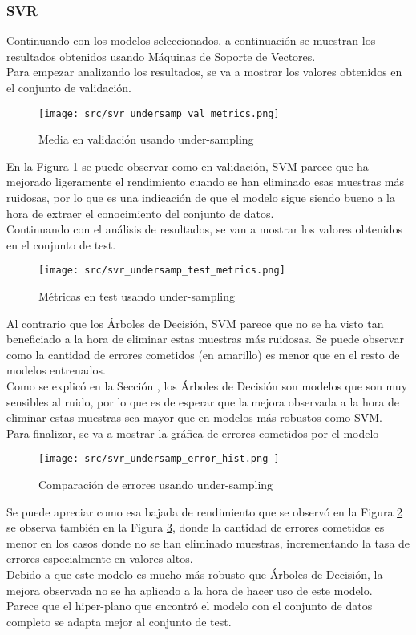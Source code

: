 \subsubsection*{SVR}
Continuando con los modelos seleccionados, a continuación se muestran los resultados obtenidos usando Máquinas de Soporte de Vectores.\\
\linebreak
Para empezar analizando los resultados, se va a mostrar los valores obtenidos en el conjunto de validación.
\begin{figure}[H]
	\centering
	\texttt{[image: src/svr\_undersamp\_val\_metrics.png]}
	\caption{Media en validación usando under-sampling}
	\label{fig:cmp_val_svr}
\end{figure}
En la Figura \ref{fig:cmp_val_svr} se puede observar como en validación, SVM parece que ha mejorado ligeramente el rendimiento cuando se han eliminado esas muestras más ruidosas, por lo que es una indicación de que el modelo sigue siendo bueno a la hora de extraer el conocimiento del conjunto de datos.\\
\clearpage
Continuando con el análisis de resultados, se van a mostrar los valores obtenidos en el conjunto de test.
\begin{figure}[H]
	\centering
	\texttt{[image: src/svr\_undersamp\_test\_metrics.png]}
	\caption{Métricas en test usando under-sampling}
	\label{fig:cmp_test_svr}
\end{figure}
Al contrario que los Árboles de Decisión, SVM parece que no se ha visto tan beneficiado a la hora de eliminar estas muestras más ruidosas. Se puede observar como la cantidad de errores cometidos (en amarillo) es menor que en el resto de modelos entrenados.\\
Como se explicó en la Sección , los Árboles de Decisión son modelos que son muy sensibles al ruido, por lo que es de esperar que la mejora observada a la hora de eliminar estas muestras sea mayor que en modelos más robustos como SVM.\\
\clearpage
Para finalizar, se va a mostrar la gráfica de errores cometidos por el modelo
\begin{figure}[H]
	\centering
	\texttt{[image: src/svr\_undersamp\_error\_hist.png ]}
	\caption{Comparación de errores usando under-sampling}
	\label{fig:cmp_error_svr}
\end{figure}
Se puede apreciar como esa bajada de rendimiento que se observó en la Figura \ref{fig:cmp_test_svr} se observa también en la Figura \ref{fig:cmp_error_svr}, donde la cantidad de errores cometidos es menor en los casos donde no se han eliminado muestras, incrementando la tasa de errores especialmente en valores altos.\\
\linebreak
Debido a que este modelo es mucho más robusto que Árboles de Decisión, la mejora observada no se ha aplicado a la hora de hacer uso de este modelo.\\
Parece que el hiper-plano que encontró el modelo con el conjunto de datos completo se adapta mejor al conjunto de test.
\clearpage
